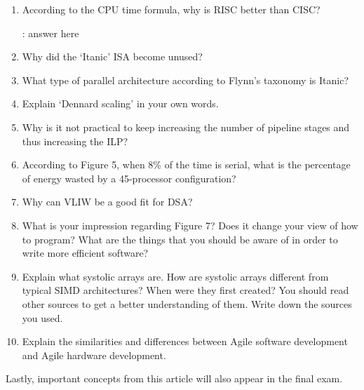 \documentclass[a4paper,12pt]{article}
\begin{document}
\begin{enumerate}
    \item According to the CPU time formula, why is RISC better than CISC?

    : answer here

    \item Why did the `Itanic' ISA become unused?

    \item What type of parallel architecture according to Flynn's taxonomy is Itanic?

    \item Explain `Dennard scaling' in your own words.

    \item Why is it not practical to keep increasing the number of pipeline stages and thus increasing the ILP?

    \item According to Figure 5, when 8\% of the time is serial, what is the percentage of energy wasted by a 45-processor configuration?

    \item Why can VLIW be a good fit for DSA?

    \item What is your impression regarding Figure 7? Does it change your view of how to program? What are the things that you should be aware of in order to write more efficient software?

    \item Explain what systolic arrays are. How are systolic arrays different from typical SIMD architectures? When were they first created? You should read other sources to get a better understanding of them. Write down the sources you used.

    \item Explain the similarities and differences between Agile software development and Agile hardware development.
\end{enumerate}

Lastly, important concepts from this article will also appear in the final exam.
\end{document}
